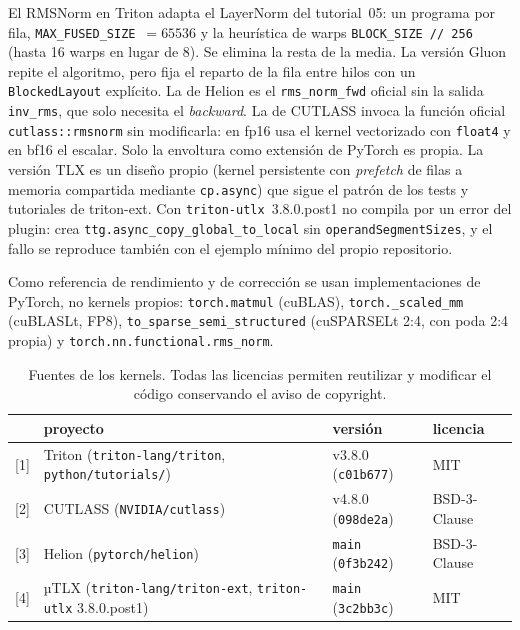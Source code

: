 El RMSNorm en Triton adapta el LayerNorm del tutorial~05: un programa por fila,
\texttt{MAX\_FUSED\_SIZE}~$=65536$ y la heurística de warps \texttt{BLOCK\_SIZE // 256}
(hasta 16 warps en lugar de 8). Se elimina la resta de la media. La versión Gluon repite
el algoritmo, pero fija el reparto de la fila entre hilos con un \texttt{BlockedLayout}
explícito. La de Helion es el \texttt{rms\_norm\_fwd} oficial sin la salida
\texttt{inv\_rms}, que solo necesita el \emph{backward}. La de CUTLASS invoca la función
oficial \texttt{cutlass::rmsnorm} sin modificarla: en fp16 usa el kernel vectorizado con
\texttt{float4} y en bf16 el escalar. Solo la envoltura como extensión de PyTorch es
propia. La versión TLX es un diseño propio (kernel persistente con \emph{prefetch} de
filas a memoria compartida mediante \texttt{cp.async}) que sigue el patrón de los tests y
tutoriales de triton-ext. Con \texttt{triton-utlx}~3.8.0.post1 no compila por un error del
plugin: crea \texttt{ttg.async\_copy\_global\_to\_local} sin \texttt{operandSegmentSizes},
y el fallo se reproduce también con el ejemplo mínimo del propio repositorio.

Como referencia de rendimiento y de corrección se usan implementaciones de PyTorch, no
kernels propios: \texttt{torch.matmul} (cuBLAS), \texttt{torch.\_scaled\_mm} (cuBLASLt,
FP8), \texttt{to\_sparse\_semi\_structured} (cuSPARSELt 2:4, con poda 2:4 propia) y
\texttt{torch.nn.functional.rms\_norm}.

\begin{table}[htbp]
  \centering\small
  \begin{tabularx}{\linewidth}{lXll}
    \toprule
    & proyecto & versión & licencia \\
    \midrule
    {[1]} & Triton (\texttt{triton-lang/triton}, \texttt{python/tutorials/}) & v3.8.0 (\texttt{c01b677}) & MIT \\
    {[2]} & CUTLASS (\texttt{NVIDIA/cutlass}) & v4.8.0 (\texttt{098de2a}) & BSD-3-Clause \\
    {[3]} & Helion (\texttt{pytorch/helion}) & \texttt{main} (\texttt{0f3b242}) & BSD-3-Clause \\
    {[4]} & µTLX (\texttt{triton-lang/triton-ext}, \texttt{triton-utlx} 3.8.0.post1) & \texttt{main} (\texttt{3c2bb3c}) & MIT \\
    \bottomrule
  \end{tabularx}
  \caption{Fuentes de los kernels. Todas las licencias permiten reutilizar y modificar el código conservando el aviso de copyright.}
  \label{tab:fuentes}
\end{table}
